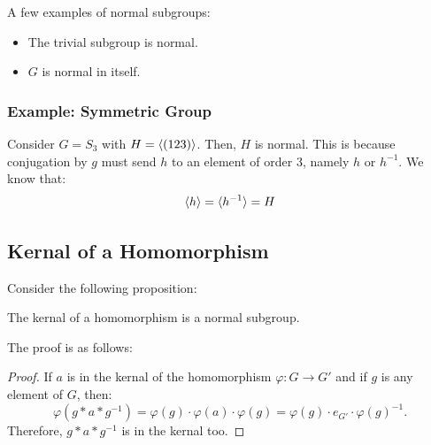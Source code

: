 \documentclass[letterpaper]{article}
\begin{document}
A few examples of normal subgroups: 
\begin{itemize}
    \item The trivial subgroup is normal. 
    \item $G$ is normal in itself. 
\end{itemize}

\subsubsection{Example: Symmetric Group}
Consider $G = S_3$ with $H = \langle (123) \rangle$. Then, $H$ is normal. This is because conjugation by $g$ must send $h$ to an element of order 3, namely $h$ or $h^{-1}$. We know that: 
\[\langle h \rangle = \langle h^{-1} \rangle = H\]

\subsection{Kernal of a Homomorphism}
Consider the following proposition: 
\begin{mdframed}
    \begin{proposition}
        The kernal of a homomorphism is a normal subgroup.
    \end{proposition}
\end{mdframed}

The proof is as follows: 
\begin{mdframed}
    \begin{proof}
        If $a$ is in the kernal of the homomorphism $\varphi: G \to G'$ and if $g$ is any element of $G$, then: 
        \[\varphi(g * a * g^{-1}) = \varphi(g) \cdot \varphi(a) \cdot \varphi(g) = \varphi(g) \cdot e_{G'} \cdot \varphi(g)^{-1}.\]
        Therefore, $g * a * g^{-1}$ is in the kernal too. 
    \end{proof}
\end{mdframed}
\end{document}
